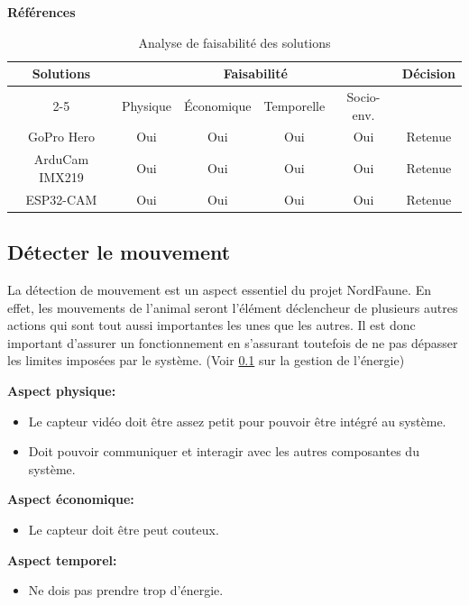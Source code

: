 \noindent\textbf{Références} 
\cite{ArduCam1}
\cite{ArduCam2}

\begin{table}[h]
    \centering
\begin{tabular}{|c|c|c|c|c|c|}
    \hline
    \centering
    \textbf{Solutions} & \multicolumn{4}{c|}{Faisabilité} & \textbf{Décision} \\
    \cline{2-5}
    & Physique & Économique & Temporelle & Socio-env. & \\
    \hline
    GoPro Hero & Oui & Oui & Oui & Oui & Retenue \\
    \hline
    ArduCam IMX219 & Oui & Oui & Oui & Oui & Retenue \\
    \hline
    ESP32-CAM & Oui & Oui & Oui & Oui & Retenue \\
    \hline
\end{tabular}
\caption{Analyse de faisabilité des solutions}
\label{tab:faisabiliteVideo}
\end{table}

\subsection{Détecter le mouvement}
La détection de mouvement est un aspect essentiel du projet NordFaune. En effet, les mouvements de l’animal seront l’élément déclencheur de plusieurs autres actions qui sont tout aussi importantes les unes que les autres. Il est donc important d’assurer un fonctionnement en s'assurant toutefois de ne pas dépasser les limites imposées par le système.  (Voir \ref{} sur la gestion de l’énergie)
\bigskip

\noindent\textbf{Aspect physique:}
\begin{itemize}
    \item Le capteur vidéo doit être assez petit pour pouvoir être intégré au système.
    \item Doit pouvoir communiquer et interagir avec les autres composantes du système.  
\end{itemize}

\noindent\textbf{Aspect économique:}
\begin{itemize}
    \item Le capteur doit être peut couteux.
\end{itemize}

\noindent\textbf{Aspect temporel:}
\begin{itemize}
    \item Ne dois pas prendre trop d’énergie.
\end{itemize}

